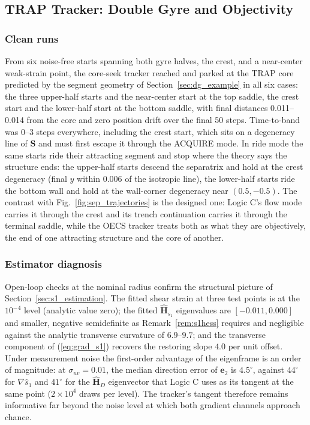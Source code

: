 \documentclass[lettersize,journal]{IEEEtran}
\begin{document}
\subsection{TRAP Tracker: Double Gyre and Objectivity}
\label{sec:results_oecs}


\subsubsection{Clean runs}
From six noise-free starts spanning both gyre halves, the crest, and a
near-center weak-strain point, the core-seek tracker reached and parked
at the TRAP core predicted by the segment geometry of
Section~\ref{sec:dg_example} in all six cases: the three upper-half
starts and the near-center start at the top saddle, the crest start and
the lower-half start at the bottom saddle, with final distances
0.011--0.014 from the core and zero position drift over the final 50
steps. Time-to-band was 0--3 steps everywhere, including the crest
start, which sits on a degeneracy line of $\mathbf{S}$ and must first
escape it through the ACQUIRE mode. In ride mode the same starts ride
their attracting segment and stop where the theory says the structure
ends: the upper-half starts descend the separatrix and hold at the
crest degeneracy (final $y$ within 0.006 of the isotropic line), the
lower-half starts ride the bottom wall and hold at the wall-corner
degeneracy near $(0.5, -0.5)$. The contrast with
Fig.~\ref{fig:sep_trajectories} is the designed one: Logic C's flow
mode carries it through the crest and its trench continuation carries
it through the terminal saddle, while the OECS tracker treats both as
what they are objectively, the end of one attracting structure and the
core of another.

\subsubsection{Estimator diagnosis}
Open-loop checks at the nominal radius confirm the structural picture
of Section~\ref{sec:s1_estimation}. The fitted shear strain at three
test points is at the $10^{-4}$ level (analytic value zero); the fitted
$\hat{\mathbf{H}}_{s_1}$ eigenvalues are $[-0.011, 0.000]$ and smaller,
negative semidefinite as Remark~\ref{rem:s1hess} requires and
negligible against the analytic transverse curvature of $6.9$--$9.7$;
and the transverse component of (\ref{eq:grad_s1}) recovers the
restoring slope $4.0$ per unit offset. Under measurement noise the
first-order advantage of the eigenframe is an order of magnitude: at
$\sigma_{uv} = 0.01$, the median direction error of $\mathbf{e}_2$ is
$4.5^\circ$, against $44^\circ$ for $\nabla\hat{s}_1$ and $41^\circ$
for the $\hat{\mathbf{H}}_D$ eigenvector that Logic C uses as its
tangent at the same point ($2\times 10^4$ draws per level). The
tracker's tangent therefore remains informative far beyond the noise
level at which both gradient channels approach chance.
\end{document}
